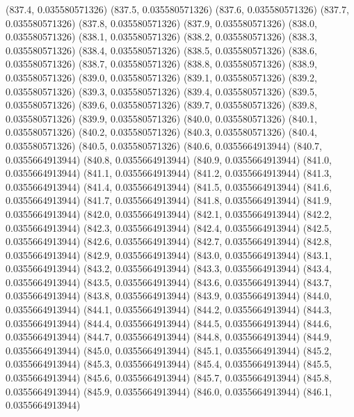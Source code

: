 {					(837.4, 0.035580571326)
					(837.5, 0.035580571326)
					(837.6, 0.035580571326)
					(837.7, 0.035580571326)
					(837.8, 0.035580571326)
					(837.9, 0.035580571326)
					(838.0, 0.035580571326)
					(838.1, 0.035580571326)
					(838.2, 0.035580571326)
					(838.3, 0.035580571326)
					(838.4, 0.035580571326)
					(838.5, 0.035580571326)
					(838.6, 0.035580571326)
					(838.7, 0.035580571326)
					(838.8, 0.035580571326)
					(838.9, 0.035580571326)
					(839.0, 0.035580571326)
					(839.1, 0.035580571326)
					(839.2, 0.035580571326)
					(839.3, 0.035580571326)
					(839.4, 0.035580571326)
					(839.5, 0.035580571326)
					(839.6, 0.035580571326)
					(839.7, 0.035580571326)
					(839.8, 0.035580571326)
					(839.9, 0.035580571326)
					(840.0, 0.035580571326)
					(840.1, 0.035580571326)
					(840.2, 0.035580571326)
					(840.3, 0.035580571326)
					(840.4, 0.035580571326)
					(840.5, 0.035580571326)
					(840.6, 0.0355664913944)
					(840.7, 0.0355664913944)
					(840.8, 0.0355664913944)
					(840.9, 0.0355664913944)
					(841.0, 0.0355664913944)
					(841.1, 0.0355664913944)
					(841.2, 0.0355664913944)
					(841.3, 0.0355664913944)
					(841.4, 0.0355664913944)
					(841.5, 0.0355664913944)
					(841.6, 0.0355664913944)
					(841.7, 0.0355664913944)
					(841.8, 0.0355664913944)
					(841.9, 0.0355664913944)
					(842.0, 0.0355664913944)
					(842.1, 0.0355664913944)
					(842.2, 0.0355664913944)
					(842.3, 0.0355664913944)
					(842.4, 0.0355664913944)
					(842.5, 0.0355664913944)
					(842.6, 0.0355664913944)
					(842.7, 0.0355664913944)
					(842.8, 0.0355664913944)
					(842.9, 0.0355664913944)
					(843.0, 0.0355664913944)
					(843.1, 0.0355664913944)
					(843.2, 0.0355664913944)
					(843.3, 0.0355664913944)
					(843.4, 0.0355664913944)
					(843.5, 0.0355664913944)
					(843.6, 0.0355664913944)
					(843.7, 0.0355664913944)
					(843.8, 0.0355664913944)
					(843.9, 0.0355664913944)
					(844.0, 0.0355664913944)
					(844.1, 0.0355664913944)
					(844.2, 0.0355664913944)
					(844.3, 0.0355664913944)
					(844.4, 0.0355664913944)
					(844.5, 0.0355664913944)
					(844.6, 0.0355664913944)
					(844.7, 0.0355664913944)
					(844.8, 0.0355664913944)
					(844.9, 0.0355664913944)
					(845.0, 0.0355664913944)
					(845.1, 0.0355664913944)
					(845.2, 0.0355664913944)
					(845.3, 0.0355664913944)
					(845.4, 0.0355664913944)
					(845.5, 0.0355664913944)
					(845.6, 0.0355664913944)
					(845.7, 0.0355664913944)
					(845.8, 0.0355664913944)
					(845.9, 0.0355664913944)
					(846.0, 0.0355664913944)
					(846.1, 0.0355664913944)
}
